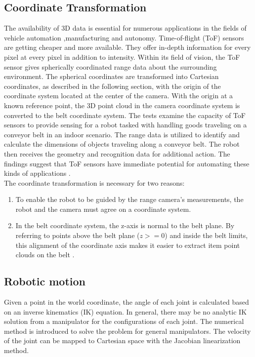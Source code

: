 \documentclass[12pt]{article}
\begin{document}
\subsection{Coordinate Transformation}
The availability of 3D data is essential for numerous applications in the fields of vehicle automation ,manufacturing and autonomy.  Time-of-flight (ToF) sensors are getting cheaper and more available. They offer in-depth information for every pixel at every pixel in addition to intensity. Within its field of vision, the ToF sensor gives spherically coordinated range data about the surrounding environment. The spherical coordinates are transformed into Cartesian coordinates, as described in the following section, with the origin of the coordinate system located at the center of the camera.  With the origin at a known reference point, the 3D point cloud in the camera coordinate system is converted to the belt coordinate system. The tests examine the capacity of ToF sensors to provide sensing for a robot tasked with handling goods traveling on a conveyor belt in an indoor scenario. The range data is utilized to identify and calculate the dimensions of objects traveling along a conveyor belt.  The robot then receives the geometry and recognition data for additional action.  The findings suggest that ToF sensors have immediate potential for automating these kinds of applications \cite{ref5}.\\

 The coordinate transformation is necessary for two reasons:\cite{ref5}
 \begin{enumerate}
     \item  To enable the robot to be guided by the range camera's measurements, the robot and the camera must agree on a coordinate system\cite{ref5}.

    \item In the belt coordinate system, the z-axis is normal to the belt plane.  By referring to points above the belt plane ($z >= 0$) and inside the belt limits, this alignment of the coordinate axis makes it easier to extract item point clouds on the belt \cite{ref5}.
 \end{enumerate}
 \subsection{Robotic motion}
Given a point in the world coordinate, the angle of each joint is calculated based on an inverse kinematics (IK) equation. In general, there may be no analytic IK solution from a manipulator for the configurations of each joint. The numerical method is introduced to solve the problem for
general manipulators. The velocity of the joint can be mapped to Cartesian space with the Jacobian linearization method\cite{ref19}.
\\
\end{document}
